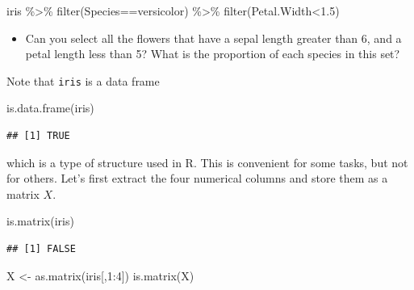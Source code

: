 \documentclass[
]{book}
\newenvironment{Shaded}{\begin{snugshade}}{\end{snugshade}}
\newcommand{\DecValTok}[1]{\textcolor[rgb]{0.00,0.00,0.81}{#1}}
\newcommand{\FloatTok}[1]{\textcolor[rgb]{0.00,0.00,0.81}{#1}}
\newcommand{\FunctionTok}[1]{\textcolor[rgb]{0.00,0.00,0.00}{#1}}
\newcommand{\NormalTok}[1]{#1}
\newcommand{\OtherTok}[1]{\textcolor[rgb]{0.56,0.35,0.01}{#1}}
\newcommand{\SpecialCharTok}[1]{\textcolor[rgb]{0.00,0.00,0.00}{#1}}
\newcommand{\StringTok}[1]{\textcolor[rgb]{0.31,0.60,0.02}{#1}}
\providecommand{\tightlist}{%
  \setlength{\itemsep}{0pt}\setlength{\parskip}{0pt}}
\theoremstyle{definition}
\theoremstyle{definition}
\theoremstyle{definition}
\theoremstyle{definition}
\theoremstyle{remark}
\begin{document}
\begin{Shaded}
\begin{Highlighting}[]
\NormalTok{iris }\SpecialCharTok{\%\textgreater{}\%} \FunctionTok{filter}\NormalTok{(Species}\SpecialCharTok{==}\StringTok{\textquotesingle{}versicolor\textquotesingle{}}\NormalTok{) }\SpecialCharTok{\%\textgreater{}\%} \FunctionTok{filter}\NormalTok{(Petal.Width}\SpecialCharTok{\textless{}}\FloatTok{1.5}\NormalTok{)}
\end{Highlighting}
\end{Shaded}

\begin{itemize}
\tightlist
\item
  Can you select all the flowers that have a sepal length greater than 6, and a petal length less than 5? What is the proportion of each species in this set?
\end{itemize}

Note that \texttt{iris} is a data frame

\begin{Shaded}
\begin{Highlighting}[]
\FunctionTok{is.data.frame}\NormalTok{(iris)}
\end{Highlighting}
\end{Shaded}

\begin{verbatim}
## [1] TRUE
\end{verbatim}

which is a type of structure used in R. This is convenient for some tasks, but not for others. Let's first extract the four numerical columns and store them as a matrix \(X\).

\begin{Shaded}
\begin{Highlighting}[]
\FunctionTok{is.matrix}\NormalTok{(iris)}
\end{Highlighting}
\end{Shaded}

\begin{verbatim}
## [1] FALSE
\end{verbatim}

\begin{Shaded}
\begin{Highlighting}[]
\NormalTok{X }\OtherTok{\textless{}{-}} \FunctionTok{as.matrix}\NormalTok{(iris[,}\DecValTok{1}\SpecialCharTok{:}\DecValTok{4}\NormalTok{])}
\FunctionTok{is.matrix}\NormalTok{(X)}
\end{Highlighting}
\end{Shaded}
\end{document}
